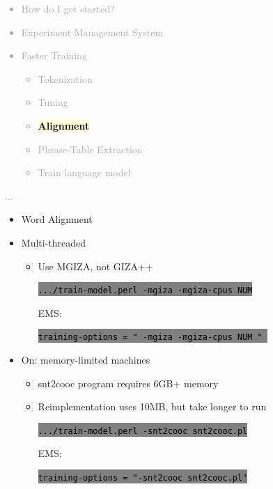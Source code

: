 \documentclass[landscape]{uedslides2C}
\newcommand{\currenttopic}[1]{\colorbox{lightyellow}{\textcolor{black}{\bf #1}}}
\newcommand{\littlecode}[1]{\colorbox{gray}{\textcolor{black}{\small \tt #1}}}
\begin{document}

\vspace{-5mm}
\textcolor{darkgrey}{
\begin{itemize} \itemsep -1mm
\item {How do I get started?}
\item {Experiment Management System}
\item {Faster Training}
  \begin{itemize}
  \item {Tokenization}
  \item {Tuning}
  \item \currenttopic{Alignment}
  \item Phrase-Table Extraction
  \item Train language model
  \end{itemize}
\end{itemize}
...
}



\begin{itemize} \itemsep -1mm

\item {Word Alignment}
\item {Multi-threaded}
  \begin{itemize}
  \item    Use MGIZA, not GIZA++
  \begin{center}
    \littlecode{.../train-model.perl -mgiza -mgiza-cpus NUM} 
  \end{center}      
  EMS: 
  \begin{center}
    \littlecode{training-options = " -mgiza -mgiza-cpus NUM " } 
  \end{center}      
  \end{itemize}

\item {On: memory-limited machines}
  \begin{itemize}
  \item snt2cooc program requires 6GB+ memory
  \item Reimplementation uses 10MB, but take longer to run
  \begin{center}
    \littlecode{.../train-model.perl -snt2cooc snt2cooc.pl} 
  \end{center}      
  EMS:
  \begin{center}
    \littlecode{training-options = "-snt2cooc snt2cooc.pl"}
  \end{center}      

  \end{itemize}
\end{itemize}
       
\end{document}
